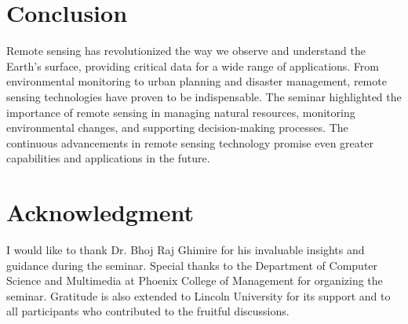 \documentclass[conference]{IEEEtran}
\begin{document}
\section{Conclusion}
Remote sensing has revolutionized the way we observe and understand the Earth's surface, providing critical data for a wide range of applications. From environmental monitoring to urban planning and disaster management, remote sensing technologies have proven to be indispensable. The seminar highlighted the importance of remote sensing in managing natural resources, monitoring environmental changes, and supporting decision-making processes. The continuous advancements in remote sensing technology promise even greater capabilities and applications in the future.

\section*{Acknowledgment}
I would like to thank Dr. Bhoj Raj Ghimire for his invaluable insights and guidance during the seminar. Special thanks to the Department of Computer Science and Multimedia at Phoenix College of Management for organizing the seminar. Gratitude is also extended to Lincoln University for its support and to all participants who contributed to the fruitful discussions.



\end{document}
